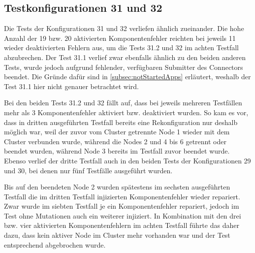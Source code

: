 \subsection{Testkonfigurationen 31 und 32}
\label{subsec:noReconf3132}

Die Tests der Konfigurationen 31 und 32 verliefen ähnlich zueinander.
Die hohe Anzahl der 19 bzw. 20 aktivierten Komponentenfehler reichten bei jeweils 11 wieder deaktivierten Fehlern aus, um die Tests 31.2 und 32 im achten Testfall abzubrechen.
Der Test 31.1 verlief zwar ebenfalls ähnlich zu den beiden anderen Tests, wurde jedoch aufgrund fehlender, verfügbaren Submitter des Connectors beendet.
Die Gründe dafür sind in \cref{subsec:notStartedApps} erläutert, weshalb der Test 31.1 hier nicht genauer betrachtet wird.

Bei den beiden Tests 31.2 und 32 fällt auf, dass bei jeweils mehreren Testfällen mehr als 3 Komponentenfehler aktiviert bzw. deaktiviert wurden.
So kam es vor, dass \zB in dritten ausgeführten Testfall bereits eine Rekonfiguration nur deshalb möglich war, weil der zuvor vom Cluster getrennte Node 1 wieder mit dem Cluster verbunden wurde, während die Nodes 2 und 4 bis 6 getrennt oder beendet wurden, während Node 3 bereits im Testfall zuvor beendet wurde.
Ebenso verlief der dritte Testfall auch in den beiden Tests der Konfigurationen 29 und 30, bei denen nur fünf Testfälle ausgeführt wurden.

Bis auf den beendeten Node 2 wurden spätestens im sechsten ausgeführten Testfall die im dritten Testfall injizierten Komponentenfehler wieder repariert.
Zwar wurde im siebten Testfall je ein Komponentenfehler repariert, jedoch im Test ohne Mutationen auch ein weiterer injiziert.
In Kombination mit den drei bzw. vier aktivierten Komponentenfehlern im achten Testfall führte das daher dazu, dass kein aktiver Node im Cluster mehr vorhanden war und der Test entsprechend abgebrochen wurde.
